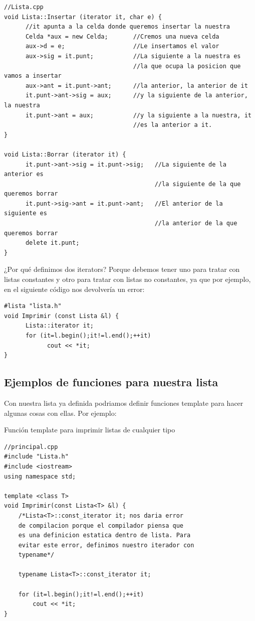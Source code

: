 \documentclass[10pt,a4paper,spanish]{report}
\begin{document}
\begin{verbatim}
//Lista.cpp
void Lista::Insertar (iterator it, char e) {
      //it apunta a la celda donde queremos insertar la nuestra
      Celda *aux = new Celda;       //Cremos una nueva celda
      aux->d = e;                   //Le insertamos el valor
      aux->sig = it.punt;           //La siguiente a la nuestra es
                                    //la que ocupa la posicion que vamos a insertar
      aux->ant = it.punt->ant;      //la anterior, la anterior de it
      it.punt->ant->sig = aux;      //y la siguiente de la anterior, la nuestra
      it.punt->ant = aux;           //y la siguiente a la nuestra, it
                                    //es la anterior a it.
}

void Lista::Borrar (iterator it) {
      it.punt->ant->sig = it.punt->sig;   //La siguiente de la anterior es 
                                          //la siguiente de la que queremos borrar
      it.punt->sig->ant = it.punt->ant;   //El anterior de la siguiente es
                                          //la anterior de la que queremos borrar
      delete it.punt;
}
\end{verbatim}

\noindent
¿Por qué definimos dos iterators? Porque debemos tener uno para tratar con listas constantes y otro para tratar con listas no constantes, ya que por ejemplo, en el siguiente código nos devolvería un error:
\begin{verbatim}
#lista "lista.h"
void Imprimir (const Lista &l) {
      Lista::iterator it;
      for (it=l.begin();it!=l.end();++it)
            cout << *it;
}
\end{verbatim}

\subsection{\textcolor[rgb]{0.2,0.5,0.5}Ejemplos de funciones para nuestra lista}
\noindent
Con nuestra lista ya definida podriamos definir funciones template para hacer algunas cosas con ellas. Por ejemplo:

\noindent
Función template para imprimir listas de cualquier tipo \label{typename}
\begin{verbatim}
//principal.cpp
#include "Lista.h"
#include <iostream>
using namespace std;

template <class T>
void Imprimir(const Lista<T> &l) {
    /*Lista<T>::const_iterator it; nos daria error
    de compilacion porque el compilador piensa que 
    es una definicion estatica dentro de lista. Para
    evitar este error, definimos nuestro iterador con
    typename*/

    typename Lista<T>::const_iterator it;

    for (it=l.begin();it!=l.end();++it)
        cout << *it;
}
\end{verbatim}
\end{document}

